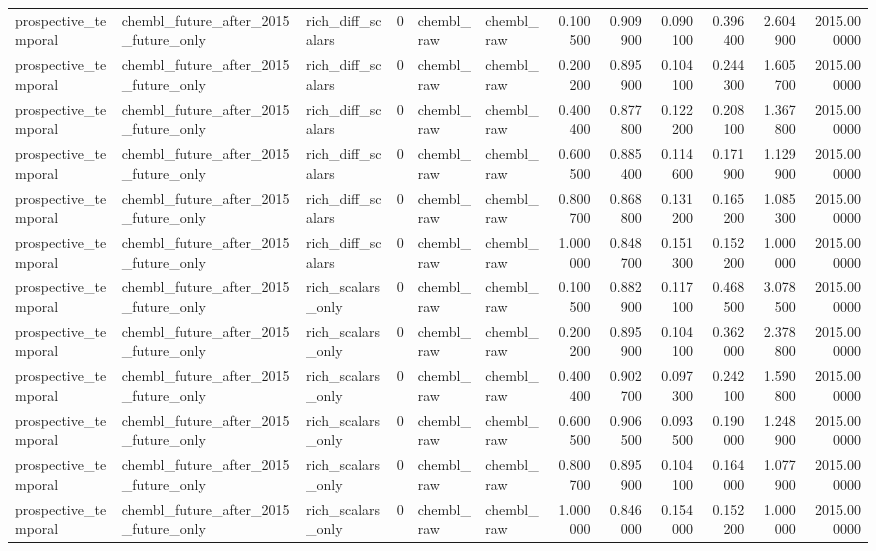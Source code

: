 \begin{longtable}{lllrllrrrrrr}
prospective\_temporal & chembl\_future\_after\_2015\_future\_only & rich\_diff\_scalars & 0 & chembl\_raw & chembl\_raw & 0.100500 & 0.909900 & 0.090100 & 0.396400 & 2.604900 & 2015.000000 \\
prospective\_temporal & chembl\_future\_after\_2015\_future\_only & rich\_diff\_scalars & 0 & chembl\_raw & chembl\_raw & 0.200200 & 0.895900 & 0.104100 & 0.244300 & 1.605700 & 2015.000000 \\
prospective\_temporal & chembl\_future\_after\_2015\_future\_only & rich\_diff\_scalars & 0 & chembl\_raw & chembl\_raw & 0.400400 & 0.877800 & 0.122200 & 0.208100 & 1.367800 & 2015.000000 \\
prospective\_temporal & chembl\_future\_after\_2015\_future\_only & rich\_diff\_scalars & 0 & chembl\_raw & chembl\_raw & 0.600500 & 0.885400 & 0.114600 & 0.171900 & 1.129900 & 2015.000000 \\
prospective\_temporal & chembl\_future\_after\_2015\_future\_only & rich\_diff\_scalars & 0 & chembl\_raw & chembl\_raw & 0.800700 & 0.868800 & 0.131200 & 0.165200 & 1.085300 & 2015.000000 \\
prospective\_temporal & chembl\_future\_after\_2015\_future\_only & rich\_diff\_scalars & 0 & chembl\_raw & chembl\_raw & 1.000000 & 0.848700 & 0.151300 & 0.152200 & 1.000000 & 2015.000000 \\
prospective\_temporal & chembl\_future\_after\_2015\_future\_only & rich\_scalars\_only & 0 & chembl\_raw & chembl\_raw & 0.100500 & 0.882900 & 0.117100 & 0.468500 & 3.078500 & 2015.000000 \\
prospective\_temporal & chembl\_future\_after\_2015\_future\_only & rich\_scalars\_only & 0 & chembl\_raw & chembl\_raw & 0.200200 & 0.895900 & 0.104100 & 0.362000 & 2.378800 & 2015.000000 \\
prospective\_temporal & chembl\_future\_after\_2015\_future\_only & rich\_scalars\_only & 0 & chembl\_raw & chembl\_raw & 0.400400 & 0.902700 & 0.097300 & 0.242100 & 1.590800 & 2015.000000 \\
prospective\_temporal & chembl\_future\_after\_2015\_future\_only & rich\_scalars\_only & 0 & chembl\_raw & chembl\_raw & 0.600500 & 0.906500 & 0.093500 & 0.190000 & 1.248900 & 2015.000000 \\
prospective\_temporal & chembl\_future\_after\_2015\_future\_only & rich\_scalars\_only & 0 & chembl\_raw & chembl\_raw & 0.800700 & 0.895900 & 0.104100 & 0.164000 & 1.077900 & 2015.000000 \\
prospective\_temporal & chembl\_future\_after\_2015\_future\_only & rich\_scalars\_only & 0 & chembl\_raw & chembl\_raw & 1.000000 & 0.846000 & 0.154000 & 0.152200 & 1.000000 & 2015.000000 \\

\end{longtable}
